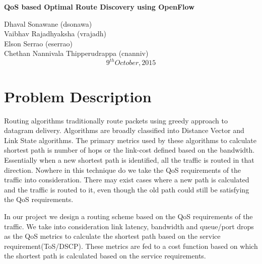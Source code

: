 \documentclass[12pt]{extarticle}
\begin{document}
  \begin{titlepage}
    \vspace*{\fill}
    \begin{center}
{\Huge \textbf{{ QoS based Optimal Route Discovery using OpenFlow }}} \\
      \vspace{20mm}
     \begin{Large}
      Dhaval Sonawane (dsonawa)\\
      Vaibhav Rajadhyaksha (vrajadh)\\
      Elson Serrao (eserrao)\\
      Chethan Nannivala Thipperudrappa (cnanniv)\\
      \vspace{10mm}
      $$9^{th} October, 2015$$
     \end{Large}
    \end{center}
    \vspace*{\fill}
  \end{titlepage}
  
  \newpage
  \vspace{4mm}
\section*{Problem Description}

Routing algorithms traditionally route packets using greedy approach to datagram delivery. Algorithms are broadly classified into Distance Vector and Link State algorithms. The primary metrics used by these algorithms to calculate shortest path is number of hops or the link-cost defined based on the  bandwidth. Essentially when a new shortest path is identified, all the traffic is routed in that direction. Nowhere in this technique do we take the QoS requirements of the traffic into consideration. There may exist cases where a new path is calculated and the traffic is routed to it, even though the old path could still be satisfying the QoS requirements. 

In our project we design a routing scheme based on the QoS requirements of the traffic. We take into consideration link latency, bandwidth and queue/port drops as the QoS metrics to calculate the shortest path based on the service requirement(ToS/DSCP). These metrics are fed to a cost function based on which the shortest path is calculated based on the service requirements.\\


\newpage
\vspace{4mm}
\end{document}
